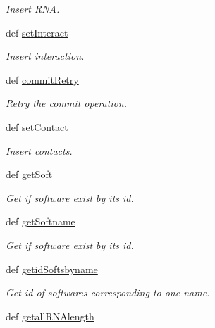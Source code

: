 \begin{DoxyCompactItemize}
\begin{DoxyCompactList}\small\item\em \-Insert \-R\-N\-A. \end{DoxyCompactList}\item 
def \hyperlink{classirna_1_1iRNA__pred_1_1Sqlite__manager_1_1Sqlite__manager_ab06ddf69854a39667ab111c373c439af}{set\-Interact}
\begin{DoxyCompactList}\small\item\em \-Insert interaction. \end{DoxyCompactList}\item 
def \hyperlink{classirna_1_1iRNA__pred_1_1Sqlite__manager_1_1Sqlite__manager_a9bbd6d43a4dd7c5f4b8523b4775d8b86}{commit\-Retry}
\begin{DoxyCompactList}\small\item\em \-Retry the commit operation. \end{DoxyCompactList}\item 
def \hyperlink{classirna_1_1iRNA__pred_1_1Sqlite__manager_1_1Sqlite__manager_a1d82da10d0bd3cd3575e0b0e054c367c}{set\-Contact}
\begin{DoxyCompactList}\small\item\em \-Insert contacts. \end{DoxyCompactList}\item 
def \hyperlink{classirna_1_1iRNA__pred_1_1Sqlite__manager_1_1Sqlite__manager_a2ba8e2f9c607a6d47d721971e4a90ac7}{get\-Soft}
\begin{DoxyCompactList}\small\item\em \-Get if software exist by its id. \end{DoxyCompactList}\item 
def \hyperlink{classirna_1_1iRNA__pred_1_1Sqlite__manager_1_1Sqlite__manager_a2951f4e1cc909ad25dc98dd48d69d80c}{get\-Softname}
\begin{DoxyCompactList}\small\item\em \-Get if software exist by its id. \end{DoxyCompactList}\item 
def \hyperlink{classirna_1_1iRNA__pred_1_1Sqlite__manager_1_1Sqlite__manager_afa3cb8e393e3f44fe793d41af380018c}{getid\-Softsbyname}
\begin{DoxyCompactList}\small\item\em \-Get id of softwares corresponding to one name. \end{DoxyCompactList}\item 
def \hyperlink{classirna_1_1iRNA__pred_1_1Sqlite__manager_1_1Sqlite__manager_ab30274419c653cbdb86bf7dab28984a1}{getall\-R\-N\-Alength}

\end{DoxyCompactItemize}
